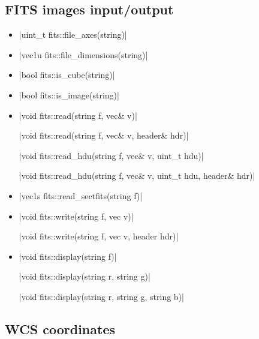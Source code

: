 \documentclass[12pt]{report}
\begin{document}
\subsection{FITS images input/output}

\begin{itemize}
\item \cppinline|uint_t fits::file_axes(string)| 

\item \cppinline|vec1u fits::file_dimensions(string)| 

\item \cppinline|bool fits::is_cube(string)| 

\item \cppinline|bool fits::is_image(string)| 

\item \cppinline|void fits::read(string f, vec& v)| 

\cppinline|void fits::read(string f, vec& v, header& hdr)|

\cppinline|void fits::read_hdu(string f, vec& v, uint_t hdu)| 

\cppinline|void fits::read_hdu(string f, vec& v, uint_t hdu, header& hdr)|

\item \cppinline|vec1s fits::read_sectfits(string f)| 

\item \cppinline|void fits::write(string f, vec v)| 

\cppinline|void fits::write(string f, vec v, header hdr)|

\item \cppinline|void fits::display(string f)| 

\cppinline|void fits::display(string r, string g)|

\cppinline|void fits::display(string r, string g, string b)|

\end{itemize}

\subsection{WCS coordinates}
\end{document}
